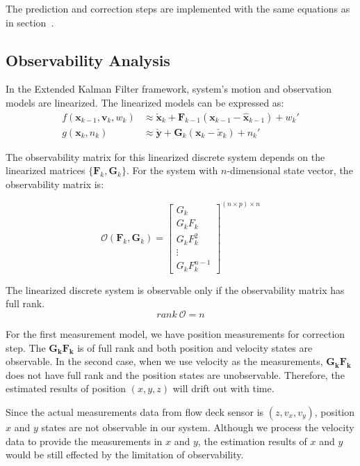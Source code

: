 \documentclass[letterpaper, 10 pt, conference]{ieeeconf}  %
\newcommand{\rom}[1]{\uppercase\expandafter{\romannumeral #1\relax}}
\begin{document}
The prediction and correction steps are implemented with the same equations as in section~\rom{4}. 
\subsection{Observability Analysis}
In the Extended Kalman Filter framework, system's motion and observation models are linearized. The linearized models can be expressed as:
\begin{equation}
\begin{split}
f(\bm{x}_{k-1},\bm{v}_k,w_k) &\approx \bm{\check{x}}_k+\bm{F}_{k-1}\left(\bm{x}_{k-1}-\bm{\hat{x}}_{k-1}\right)+w_k' \\
g(\bm{x}_k,n_k) &\approx \bm{\check{y}}+\bm{G}_k\left(\bm{x}_k-\check{x}_k\right)+n_k'
\end{split}
\end{equation}

The observability matrix for this linearized discrete system depends on the linearized matrices $\{\bm{F}_k,\bm{G}_k\}$. For the system with $n$-dimensional state vector, the observability matrix is:

\begin{equation}
\mathcal{O}(\bm{F}_k,\bm{G}_k)=\begin{bmatrix}
G_k        \\
G_k F_k    \\
G_k F_k^2  \\
\vdots     \\
G_k F_k^{n-1}
\end{bmatrix}^{\left(n\times p\right)\times n}
\end{equation}

The linearized discrete system is observable only if the observability matrix has full rank.
\begin{equation}
rank~\mathcal{O} = n
\end{equation}

For the first measurement model, we have position measurements for correction step. The $\bm{G_k F_k}$ is of full rank and both position and velocity states are observable. In the second case, when we use velocity as the measurements, $\bm{G_k F_k}$ does not have full rank and the position states are unobservable. Therefore, the estimated results of position $(x, y, z)$ will drift out with time.

Since the actual measurements data from flow deck sensor is $(z,v_x,v_y)$, position $x$ and $y$ states are not observable in our system. Although we process the velocity data to provide the measurements in $x$ and $y$, the estimation results of $x$ and $y$ would be still effected by the limitation of observability. 
\end{document}
